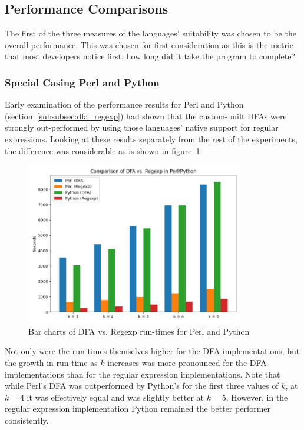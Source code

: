 \subsection{Performance Comparisons}
\label{subsec:perf_comp}

The first of the three measures of the languages' suitability was chosen to be the overall performance. This was chosen for first consideration as this is the metric that most developers notice first: how long did it take the program to complete?

\subsubsection{Special Casing Perl and Python}
\label{subsubsec:results:perf_perl_python}

Early examination of the performance results for Perl and Python (section~\ref{subsubsec:dfa_regexp}) had shown that the custom-built DFAs were strongly out-performed by using those languages' native support for regular expressions. Looking at these results separately from the rest of the experiments, the difference was considerable as is shown in figure~\ref{fig:graph:dfa_regexp_comp}.

\begin{figure}[h]
	\centering
	\includegraphics[width=0.85\textwidth]{figures/dfa_regexp_comp.png}
	\caption{Bar charts of DFA vs. Regexp run-times for Perl and Python}
	\label{fig:graph:dfa_regexp_comp}
\end{figure}

Not only were the run-times themselves higher for the DFA implementations, but the growth in run-time as $k$ increases was more pronounced for the DFA implementations than for the regular expression implementations. Note that while Perl's DFA was outperformed by Python's for the first three values of $k$, at $k=4$ it was effectively equal and was slightly better at $k=5$. However, in the regular expression implementation Python remained the better performer consistently.

